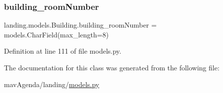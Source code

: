 \subsubsection{\texorpdfstring{building\+\_\+room\+Number}{building\_roomNumber}}
{\footnotesize\ttfamily landing.\+models.\+Building.\+building\+\_\+room\+Number = models.\+Char\+Field(max\+\_\+length=8)\hspace{0.3cm}{\ttfamily [static]}}



Definition at line 111 of file models.\+py.



The documentation for this class was generated from the following file\+:\begin{DoxyCompactItemize}
\item 
mav\+Agenda/landing/\mbox{\hyperlink{models_8py}{models.\+py}}\end{DoxyCompactItemize}
